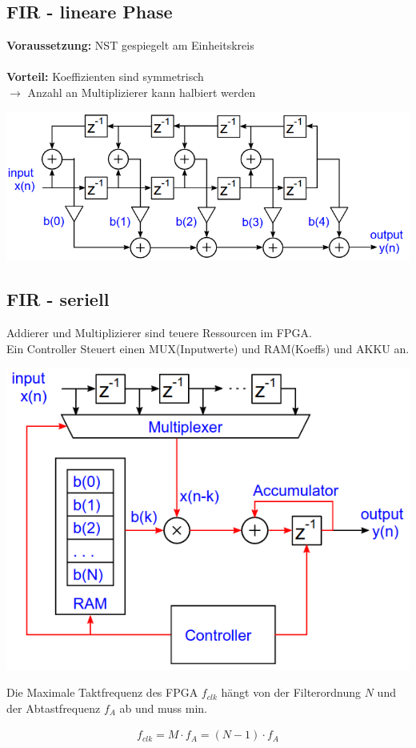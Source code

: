 \documentclass[10pt,a4paper]{article}
\begin{document}
\subsection{FIR - lineare Phase}
\textbf{Voraussetzung: } NST \grqq{}gespiegelt\grqq{} am Einheitskreis\\
\\\textbf{Vorteil: } Koeffizienten sind symmetrisch\\ $\rightarrow$ Anzahl an Multiplizierer kann halbiert werden
  \begin{center}
      \includegraphics[width=.35\textwidth]{./img/firlinear.png}
  \end{center}

\subsection{FIR - seriell}
Addierer und Multiplizierer sind teuere Ressourcen im FPGA.\\
Ein Controller Steuert einen MUX(Inputwerte) und RAM(Koeffs) und AKKU an.
  \begin{center}
      \includegraphics[width=.35\textwidth]{./img/firseriell.png}
  \end{center}
Die Maximale Taktfrequenz des FPGA $f_{clk}$ hängt von der Filterordnung $N$ 
und der Abtastfrequenz $f_A$ ab und muss min.
  \begin{mdframed}[style=exercise]
    \begin{align}
        f_{clk}= M \cdot f_A = (N-1)\cdot f_A
    \end{align}
  \end{mdframed}
\end{document}
